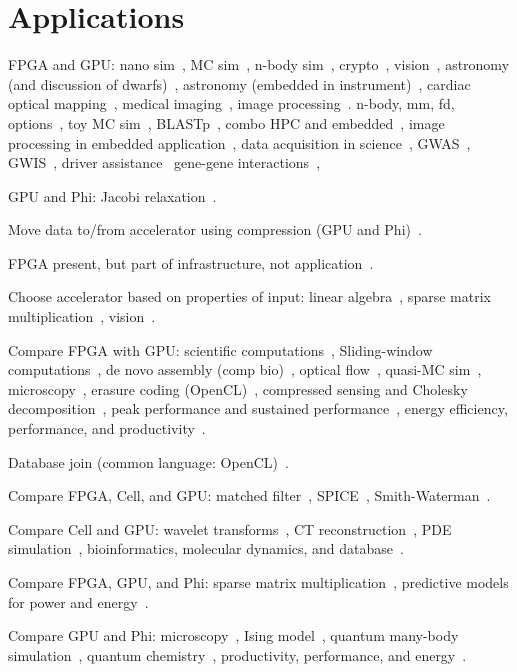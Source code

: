 \section{Applications}
\label{sec:apps}

FPGA and GPU:
nano sim~\cite{khdo06},
MC sim~\cite{shsc08,tttl10},
n-body sim~\cite{tl10},
crypto~\cite{dfg+13},
vision~\cite{bkdb10,brf14,ghgb11},
astronomy (and discussion of dwarfs)~\cite{ibs12},
astronomy (embedded in instrument)~\cite{kgb+14},
cardiac optical mapping~\cite{mjk12},
medical imaging~\cite{szb+12,sll13},
image processing~\cite{dbd+13}.
n-body, mm, fd, options~\cite{whk+14},
toy MC sim~\cite{admb14},
BLASTp~\cite{Papad14},
combo HPC and embedded~\cite{rpm+15},
image processing in embedded application~\cite{enr+18,nsg+16,zxl+18},
data acquisition in science~\cite{cab+17,vac+16},
GWAS~\cite{kws+16},
GWIS~\cite{wkhe17},
driver assistance~\cite{wlhk17}
gene-gene interactions~\cite{wkhe18},

GPU and Phi:
Jacobi relaxation~\cite{cv16}.

Move data to/from accelerator using compression (GPU and Phi)~\cite{bkp15}.

FPGA present, but part of infrastructure, not application~\cite{abb+13}.

Choose accelerator based on properties of input:
linear algebra~\cite{gchg16,sll+13},
sparse matrix multiplication~\cite{gsbh16},
vision~\cite{mfo+16}.


Compare FPGA with GPU:
scientific computations~\cite{wghp11},
Sliding-window computations~\cite{cfbs15},
de novo assembly (comp bio)~\cite{mjk+16},
optical flow~\cite{bnw+10}, quasi-MC sim~\cite{tb10},
microscopy~\cite{tzwz15}, erasure coding (OpenCL)~\cite{czs+16},
compressed sensing and Cholesky decomposition~\cite{ypl12},
peak performance and sustained performance~\cite{vn14},
energy efficiency, performance, and productivity~\cite{cdde13}.

Database join (common language: OpenCL)~\cite{rl17}.

Compare FPGA, Cell, and GPU:
matched filter~\cite{bgt07}, SPICE~\cite{kd09}, Smith-Waterman~\cite{bal+12}.

Compare Cell and GPU:
wavelet transforms~\cite{bck+11}, CT reconstruction~\cite{skkh07},
PDE simulation~\cite{rd10},
bioinformatics, molecular dynamics, and database~\cite{pts+12}.

Compare FPGA, GPU, and Phi:
sparse matrix multiplication~\cite{gsbh16},
predictive models for power and energy~\cite{opr+17}.

Compare GPU and Phi:
microscopy~\cite{tkk+14}, Ising model~\cite{ws13},
quantum many-body simulation~\cite{Lyakh15},
quantum chemistry~\cite{lrg14},
productivity, performance, and energy~\cite{mlp+17}.

